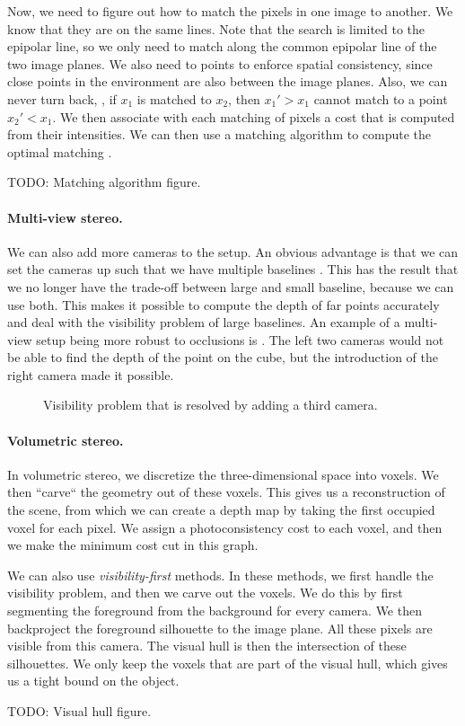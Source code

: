 Now, we need to figure out how to match the pixels in one image to another. We
know that they are on the same lines. Note that the search is limited to the
epipolar line, so we only need to match along the common epipolar line of the
two image planes. We also need to points to enforce spatial consistency, since
close points in the environment are also between the image planes. Also, we can
never turn back, \ie, if $x_1$ is matched to $x_2$, then $x_1' > x_1$ cannot
match to a point $x_2' < x_1$. We then associate with each matching of pixels a
cost that is computed from their intensities. We can then use a matching
algorithm to compute the optimal matching \citep{baker1981depth}.

TODO: Matching algorithm figure.

\paragraph{Multi-view stereo.}

We can also add more cameras to the setup. An obvious advantage is that we can
set the cameras up such that we have multiple baselines
\citep{okutomi1993multiple}. This has the result that we no longer have the
trade-off between large and small baseline, because we can use both. This makes
it possible to compute the depth of far points accurately and deal with the
visibility problem of large baselines. An example of a multi-view setup being
more robust to occlusions is . The left two
cameras would not be able to find the depth of the point on the cube, but the
introduction of the right camera made it possible.

\begin{figure}[t]
    \centering
    \caption{Visibility problem that is resolved by adding a third camera.}
    \label{fig:visibility-problem}
\end{figure}

\paragraph{Volumetric stereo.}

In volumetric stereo, we discretize the three-dimensional space into
voxels. We then ``carve``
the geometry out of these voxels. This gives us a reconstruction of the scene,
from which we can create a depth map by taking the first occupied voxel for
each pixel. We assign a photoconsistency cost to each voxel, and then we make
the minimum cost cut in this graph.

We can also use \textit{visibility-first} methods. In these methods, we first
handle the visibility problem, and then we carve out the voxels. We do this by
first segmenting the foreground from the background for every camera. We then
backproject the foreground silhouette to the image plane. All these pixels are
visible from this camera. The visual hull is then the intersection of these
silhouettes. We only keep the voxels that are part of the visual hull, which
gives us a tight bound on the object.

TODO: Visual hull figure.
